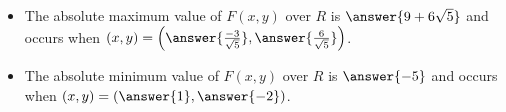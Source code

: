 \documentclass{ximera}
\begin{document}
\begin{exercise}
\begin{exercise}
\begin{exercise}
\begin{itemize}
\item The absolute maximum value of $F(x,y)$ over $R$ is $\answer{ 9 +6\sqrt{5} }$ and occurs when $(x,y) = \left( \answer{\frac{-3}{\sqrt{5}}},  \answer{\frac{6}{\sqrt{5}}} \right) $.
\item The absolute minimum value of $F(x,y)$ over $R$ is $\answer{ -5 }$ and occurs when $(x,y) = \left(\answer{1},\answer{-2}\right)$.
\end{itemize}
\end{exercise}


\end{exercise}


\end{exercise}
\end{document}
